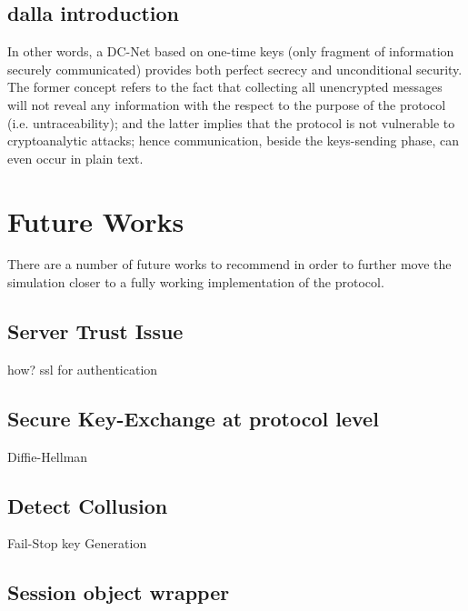 \subsection{dalla introduction}
In other words, a DC-Net based on one-time keys (only fragment of information securely communicated) provides both perfect secrecy and unconditional security. The former concept refers to the fact that collecting all unencrypted messages will not reveal any information with the respect to the purpose of the protocol (i.e. untraceability); and the latter implies that the protocol is not vulnerable to cryptoanalytic attacks; hence communication, beside the keys-sending phase, can even occur in plain text.



\section{Future Works}
There are a number of future works to recommend in order to further move the simulation closer to a fully working implementation of the protocol.


\subsection{Server Trust Issue}
how? ssl for authentication

\subsection{Secure Key-Exchange at protocol level}
Diffie-Hellman

\subsection{Detect Collusion}
Fail-Stop key Generation

\subsection{Session object wrapper}